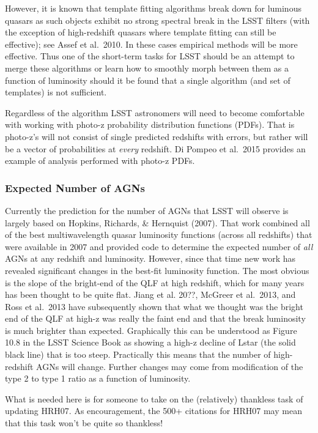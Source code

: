 However, it is known that template fitting algorithms break down for luminous quasars as such objects exhibit no strong spectral break in the LSST filters (with the exception of high-redshift quasars where template fitting can still be effective); see Assef et al.\ 2010.  In these cases empirical methods will be more effective.  Thus one of the short-term tasks for LSST should be an attempt to merge these algorithms or learn how to smoothly morph between them as a function of luminosity should it be found that a single algorithm (and set of templates) is not sufficient.

Regardless of the algorithm LSST astronomers will need to become comfortable with working with photo-z probability distribution functions (PDFs).   That is photo-z's will not consist of single predicted redshifts with errors, but rather will be a vector of probabilities at {\em every} redshift.   Di Pompeo et al.\ 2015 provides an example of analysis performed with photo-z PDFs.


\subsubsection{Expected Number of AGNs}

Currently the prediction for the number of AGNs that LSST will observe is largely based on Hopkins, Richards, \& Hernquist (2007).  That work combined all of the best multiwavelength quasar luminosity functions (across all redshifts) that were available in 2007 and provided code to determine the expected number of {\em all} AGNs at any redshift and luminosity.  However, since that time new work has revealed significant changes in the best-fit luminosity function.  The most obvious is the slope of the bright-end of the QLF at high redshift, which for many years has been thought to be quite flat.  Jiang et al. 20??, McGreer et al.\ 2013, and Ross et al.\ 2013 have subsequently shown that what we thought was the bright end of the QLF at high-z was really the faint end and that the break luminosity is much brighter than expected.   Graphically this can be understood as Figure 10.8 in the LSST Science Book as showing a high-z decline of Lstar (the solid black line) that is too steep.  Practically this means that the number of high-redshift AGNs will change.   Further changes may come from modification of the type 2 to type 1 ratio as a function of luminosity.

What is needed here is for someone to take on the (relatively) thankless task of updating HRH07.  As encouragement, the 500+ citations for HRH07 may mean that this task won't be quite so thankless!


